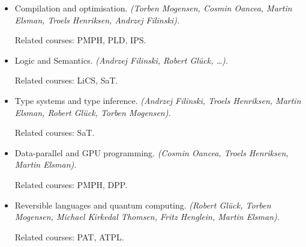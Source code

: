 \documentclass[rgb,dvipsnames,aspectratio=169]{beamer}
\begin{document}
\begin{frame}[fragile]


  \vfill

  \begin{itemize}
  \item Compilation and optimisation.
    \emph{(Torben Mogensen, Cosmin Oancea, Martin Elsman, Troels Henriksen, Andrzej Filinski).}

    Related courses: PMPH, PLD, IPS.

  \item Logic and Semantics.
    \emph{(Andrzej Filinski, Robert Glück, …).}

    Related courses: LiCS, SaT.

  \item Type systems and type inference.
    \emph{(Andrzej Filinski, Troels Henriksen, Martin Elsman, Robert Glück, Torben Mogensen).}

    Related courses: SaT.

  \item Data-parallel and GPU programming.
    \emph{(Cosmin Oancea, Troels Henriksen, Martin Elsman).}

    Related courses: PMPH, DPP.

  \item Reversible languages and quantum computing.
    \emph{(Robert Glück, Torben Mogensen, Michael Kirkedal Thomsen, Fritz Henglein, Martin Elsman).}

    Related courses: PAT, ATPL.

  \end{itemize}
\end{frame}
\end{document}
